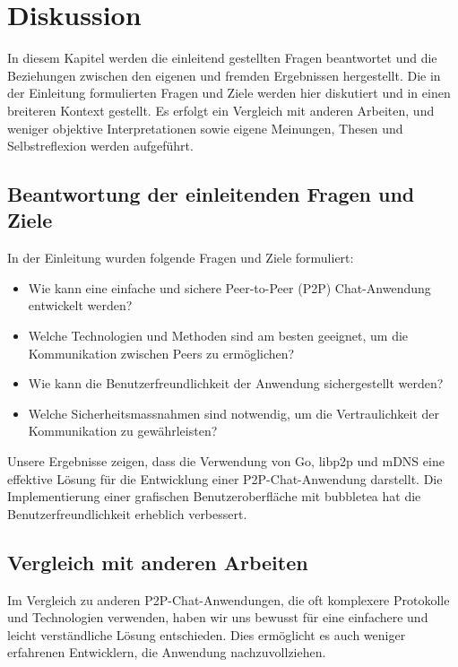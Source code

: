 \section{Diskussion}

In diesem Kapitel werden die einleitend gestellten Fragen beantwortet und die Beziehungen zwischen den eigenen und fremden Ergebnissen hergestellt. Die in der Einleitung formulierten Fragen und Ziele werden hier diskutiert und in einen breiteren Kontext gestellt. Es erfolgt ein Vergleich mit anderen Arbeiten, und weniger objektive Interpretationen sowie eigene Meinungen, Thesen und Selbstreflexion werden aufgeführt.

\subsection{Beantwortung der einleitenden Fragen und Ziele}

In der Einleitung wurden folgende Fragen und Ziele formuliert:
\begin{itemize}
    \item Wie kann eine einfache und sichere Peer-to-Peer (P2P) Chat-Anwendung entwickelt werden?
    \item Welche Technologien und Methoden sind am besten geeignet, um die Kommunikation zwischen Peers zu ermöglichen?
    \item Wie kann die Benutzerfreundlichkeit der Anwendung sichergestellt werden?
    \item Welche Sicherheitsmassnahmen sind notwendig, um die Vertraulichkeit der Kommunikation zu gewährleisten?
\end{itemize}

Unsere Ergebnisse zeigen, dass die Verwendung von Go, libp2p und mDNS eine effektive Lösung für die Entwicklung einer P2P-Chat-Anwendung darstellt. Die Implementierung einer grafischen Benutzeroberfläche mit bubbletea hat die Benutzerfreundlichkeit erheblich verbessert.

\subsection{Vergleich mit anderen Arbeiten}

Im Vergleich zu anderen P2P-Chat-Anwendungen, die oft komplexere Protokolle und Technologien verwenden, haben wir uns bewusst für eine einfachere und leicht verständliche Lösung entschieden. Dies ermöglicht es auch weniger erfahrenen Entwicklern, die Anwendung nachzuvollziehen.

